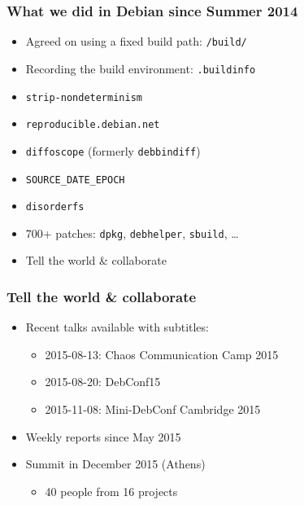 \documentclass[14pt,aspectratio=169]{beamer}
\begin{document}
\begin{frame}
 \frametitle{What we did in Debian since Summer 2014}

 \begin{itemize}
  \item Agreed on using a fixed build path: \texttt{/build/}
  \item Recording the build environment: \texttt{.buildinfo}
  \item \texttt{strip-nondeterminism}
  \item \texttt{reproducible.debian.net}
  \item \texttt{diffoscope} (formerly \texttt{debbindiff})
  \item \texttt{SOURCE\_DATE\_EPOCH}
  \item \texttt{disorderfs}
  \item 700+ patches: \texttt{dpkg}, \texttt{debhelper}, \texttt{sbuild}, …
  \item<2> Tell the world \& collaborate
 \end{itemize}
\end{frame}


\begin{frame}
 \frametitle{Tell the world \& collaborate}

 \begin{itemize}
  \item Recent talks available with subtitles:
   \begin{itemize}
    \item 2015-08-13: Chaos Communication Camp 2015
    \item 2015-08-20: DebConf15
    \item 2015-11-08: Mini-DebConf Cambridge 2015
   \end{itemize}
  \item Weekly reports since May 2015
  \item Summit in December 2015 (Athens)
   \begin{itemize}
    \item 40 people from 16 projects
   \end{itemize}
 \end{itemize}
\end{frame}
\end{document}
